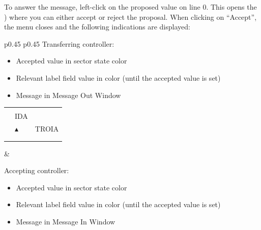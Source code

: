 \documentclass[a4paper,oneside,11pt]{memoir}
\begin{document}
To answer the message, left-click on the proposed value on line 0. This opens the ) where you can either accept or reject the proposal. When clicking on “Accept”, the menu closes and the following indications are displayed:

\begin{longtable}{p{} p{}}
  Transferring controller:

  \begin{itemize}
    \item Accepted value in sector state color
    \item Relevant label field value in  color (until the accepted value is set)
    \item Message in Message Out Window
  \end{itemize}
  
  \begin{tabular}{
    >{\columncolor{Flight Highlight}}l 
    >{\columncolor{Flight Highlight}}l
    >{\columncolor{Flight Highlight}}l }
    {\color{Assumed} H360} & {\color{Assumed} }       & {\color{Assumed} }      \\
    {\color{Assumed} ABC123} & {\color{Coordination} IDA}       & {\color{Assumed} }      \\
    {\color{Assumed} 100}    & {\color{Assumed} $\blacktriangle$} & {\color{Assumed} TROIA} \\
    {\color{Assumed} 180}    & {\color{Assumed} }          & {\color{Assumed} }\\     
    {\color{Information} AHDG}    & {\color{Assumed} }          & {\color{Assumed} }     
  \end{tabular}

  &

  Accepting controller:

  \begin{itemize}
    \item Accepted value in sector state color
    \item Relevant label field value in  color (until the accepted value is set)
    \item Message in Message In Window
  \end{itemize}
  

\end{longtable}
\end{document}
